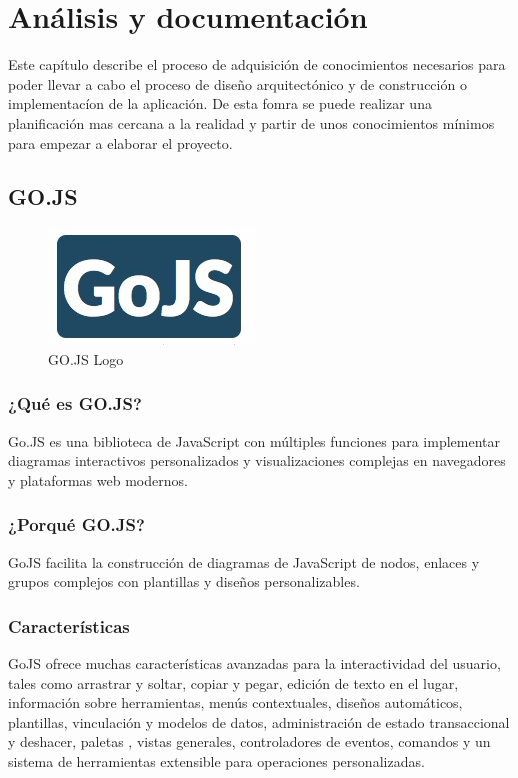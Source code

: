 \documentclass[a4paper,12pt]{book}
\begin{document}
	
	
	\afterpage{\null\newpage}
	\newpage
	

	 \chapter{Análisis y documentación}
	 Este capítulo describe el proceso de adquisición de conocimientos necesarios para poder llevar a cabo el proceso de diseño arquitectónico y de construcción o implementacíon de la aplicación. De esta fomra se puede realizar una planificación mas cercana a la realidad y partir de unos conocimientos mínimos para empezar a elaborar el proyecto.
	 
	 \minitoc
	 
	 	\section{GO.JS}
	 		
	 		
	 		\begin{figure}[H]
	 			\centering
	 			\includegraphics[scale=1]{gojs.jpeg}
	 			\caption{GO.JS Logo}\label{fig:gojs}
	 		\end{figure}
	 	
	 	
	 		\subsection{¿Qué es GO.JS?}
	 			Go.JS \cite{gojs} es una biblioteca de JavaScript con múltiples funciones para implementar diagramas interactivos personalizados y visualizaciones complejas en navegadores y plataformas web modernos.
	 	
	 		\subsection{¿Porqué GO.JS?}
	 		 GoJS facilita la construcción de diagramas de JavaScript de nodos, enlaces y grupos complejos con plantillas y diseños personalizables.
	 		
	 		
	 		\subsection{Características}
	 		GoJS ofrece muchas características avanzadas para la interactividad del usuario, tales como arrastrar y soltar, copiar y pegar, edición de texto en el lugar, información sobre herramientas, menús contextuales, diseños automáticos, plantillas, vinculación y modelos de datos, administración de estado transaccional y deshacer, paletas , vistas generales, controladores de eventos, comandos y un sistema de herramientas extensible para operaciones personalizadas.
	 		
\end{document}
